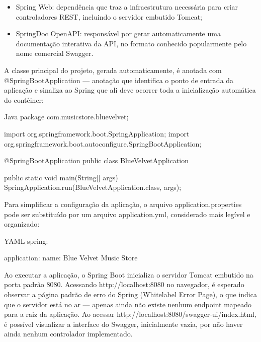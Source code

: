 \begin{itemize}
  \item Spring Web: dependência que traz a infraestrutura necessária para criar controladores REST, incluindo o servidor embutido Tomcat;
\end{itemize}

\begin{itemize}
  \item SpringDoc OpenAPI: responsável por gerar automaticamente uma documentação interativa da API, no formato conhecido popularmente pelo nome comercial Swagger.
\end{itemize}

A classe principal do projeto, gerada automaticamente, é anotada com @SpringBootApplication — anotação que identifica o ponto de entrada da aplicação e sinaliza ao Spring que ali deve ocorrer toda a inicialização automática do contêiner:

\begin{codebox}{Java}
package com.musicstore.bluevelvet;

import org.springframework.boot.SpringApplication;
import org.springframework.boot.autoconfigure.SpringBootApplication;

@SpringBootApplication
public class BlueVelvetApplication {

       public static void main(String[] args) {
           SpringApplication.run(BlueVelvetApplication.class, args);
       }

}
\end{codebox}

Para simplificar a configuração da aplicação, o arquivo application.properties pode ser substituído por um arquivo application.yml, considerado mais legível e organizado:

\begin{codebox}{YAML}
spring:
\end{codebox}

\begin{infobox}{application:}
name: Blue Velvet Music Store
\end{infobox}

Ao executar a aplicação, o Spring Boot inicializa o servidor Tomcat embutido na porta padrão 8080. Acessando http://localhost:8080 no navegador, é esperado observar a página padrão de erro do Spring (Whitelabel Error Page), o que indica que o servidor está no ar — apenas ainda não existe nenhum endpoint mapeado para a raiz da aplicação. Ao acessar http://localhost:8080/swagger-ui/index.html, é possível visualizar a interface do Swagger, inicialmente vazia, por não haver ainda nenhum controlador implementado.


